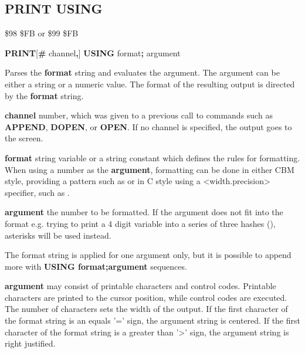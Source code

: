 \subsection{PRINT USING}
\begin{description}[leftmargin=2cm,style=nextline]
\item [Token:] \$98 \$FB or \$99 \$FB
\item [Format:] {\bf PRINT}[{\bf\#} channel{\bf,}] {\bf USING} format{\bf;} argument
\item [Usage:]  Parses the {\bf format} string and evaluates the argument.
                The argument can be either a string or a numeric value.
                The format of the resulting output is directed
                by the {\bf format} string.

                {\bf channel} number, which was given to a previous
                call to commands such as {\bf APPEND}, {\bf DOPEN}, or {\bf OPEN}.
                If no channel is specified, the output goes to the screen.

                {\bf format} string variable or a string constant
                which defines the rules for formatting.
                When using a number as the {\bf argument}, formatting can be done in either
                CBM style, providing a pattern such as 
                or in C style using a <width.precision> specifier, such as .

                {\bf argument} the number to be formatted. If the argument does not fit into the format
                e.g. trying to print a 4 digit variable into a series of three
                hashes (\screentext{\#\#\#}), asterisks will be used instead.

\item [Remarks:] The format string is applied for one argument only,
                 but it is possible to append more with
                 {\bf USING format;argument} sequences.

                {\bf argument} may consist of printable
                characters and control codes. Printable characters
                are printed to the cursor position, while control
                codes are executed.
                The number of \screentext{\#} characters sets the width of the output.
                If the first character of the format string
                is an equals '=' sign, the argument string is centered.
                If the first character of the format string
                is a greater than '>' sign, the argument string is right justified.




\end{description}
